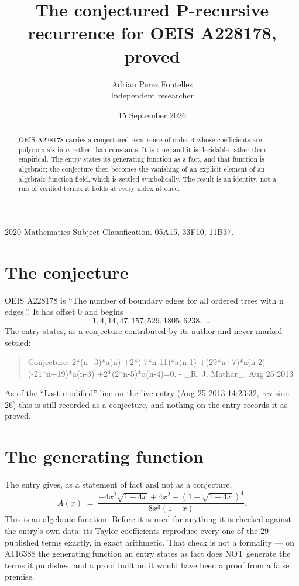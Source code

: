 \documentclass[11pt,a4paper]{article}
\title{The conjectured P-recursive recurrence for OEIS A228178, proved}
\author{Adrian Perez Fontelles\\ \small Independent researcher}
\date{15 September 2026}
\theoremstyle{plain}
\theoremstyle{definition}
\begin{document}
\maketitle

\begin{abstract}
OEIS A228178 carries a conjectured recurrence of order $4$ whose coefficients are polynomials in
$n$ rather than constants. It is true, and it is decidable rather than empirical. The entry
states its generating function as a fact, and that function is algebraic; the conjecture then
becomes the vanishing of an explicit element of an algebraic function field, which is settled
symbolically. The result is an identity, not a run of verified terms: it holds at every index
at once.
\end{abstract}

\noindent\small 2020 Mathematics Subject Classification. 05A15, 33F10, 11B37.\normalsize

\section{The conjecture}

OEIS A228178 is ``The number of boundary edges for all ordered trees with n edges.''. It has offset $0$ and begins
\[
1, 4, 14, 47, 157, 529, 1805, 6238,\ \dots
\]
The entry states, as a conjecture contributed by its author and never marked settled:
\begin{quote}\raggedright\small
Conjecture: 2*(n+3)*a(n) +2*(-7*n-11)*a(n-1) +(29*n+7)*a(n-2) +(-21*n+19)*a(n-3) +2*(2*n-5)*a(n-4)=0. - \_R. J. Mathar\_, Aug 25 2013
\end{quote}
As of the ``Last modified'' line on the live entry (Aug 25 2013 14:23:32, revision 26)
this is still recorded as a conjecture, and nothing on the entry records it as proved.

\section{The generating function}

The entry gives, as a statement of fact and not as a conjecture,
\[
A(x)\;=\;\frac{- 4 x^{2} \sqrt{1 - 4 x} + 4 x^{2} + \left(1 - \sqrt{1 - 4 x}\right)^{4}}{8 x^{3} \left(1 - x\right)} .
\]
This is an algebraic function. Before it is used for anything it is checked against the entry's
own data: its Taylor coefficients reproduce every one of the $29$ published terms
exactly, in exact arithmetic. That check is not a formality --- on A116388 the generating
function an entry states as fact does NOT generate the terms it publishes, and a proof built on
it would have been a proof from a false premise.
\end{document}
